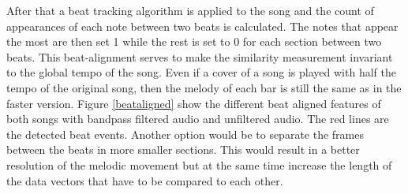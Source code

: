 After that a beat tracking algorithm is applied to the song and the count of appearances of each note between two beats is calculated. The notes that appear the most are then set 1 while the rest is set to 0 for each section between two beats. This beat-alignment serves to make the similarity measurement invariant to the global tempo of the song. Even if a cover of a song is played with half the tempo of the original song, then the melody of each bar is still the same as in the faster version.
Figure \ref{beataligned} show the different beat aligned features of both songs with bandpass filtered audio and unfiltered audio. The red lines are the detected beat events.
Another option would be to separate the frames between the beats in more smaller sections. This would result in a better resolution of the melodic movement but at the same time increase the length of the data vectors that have to be compared to each other.

